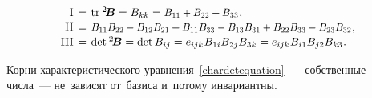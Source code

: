 \begin{otherlanguage}{russian}
\vspace{-0.25em}\begin{equation}\label{invariants:2}
\begin{array}{r@{\hspace{.4em}}c@{\hspace{.4em}}l}
\mathrm{I} & = & \operatorname{tr}\hspace{.1ex} {^2\!\bm{B}} = B_{kk} = \scalebox{0.92}[0.96]{$B_{11} + B_{22} + B_{33}$} \hspace{.1ex} ,\\[0.1em]
\mathrm{II} & = & \scalebox{0.92}[0.96]{$B_{11}B_{22} - B_{12}B_{21} + B_{11}B_{33} - B_{13}B_{31} + B_{22}B_{33} - B_{23}B_{32}$} \hspace{.1ex} ,\\[0.1em]
\mathrm{III} & = & \operatorname{det} \hspace{.1ex} {^2\!\bm{B}} = \operatorname{det} B_{ij} = e_{ijk} \hspace{.1ex} B_{1i} B_{2j} B_{3k} = e_{ijk} \hspace{.1ex} B_{i1} B_{j2} B_{k3} \hspace{.1ex} .
\end{array}\end{equation}

Корни характеристического уравнения~\eqref{chardetequation}~--- собственные числа~--- не~зависят от~базиса и~потому инвариантны.


\end{otherlanguage}
